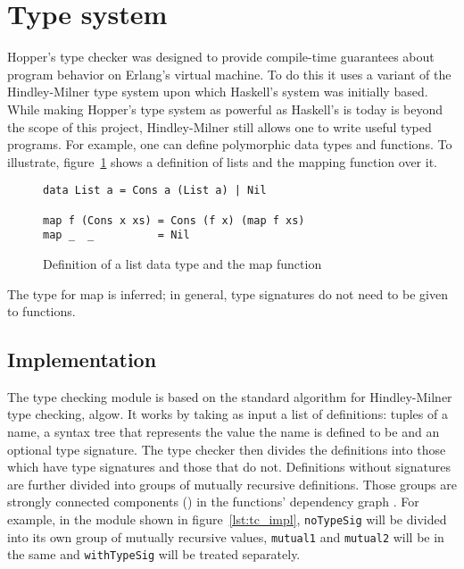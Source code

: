 \section{Type system}
\label{sec:dai_tc}

Hopper's type checker was designed to provide compile-time guarantees about program behavior on Erlang's virtual machine. To do this it uses a variant of the Hindley-Milner\cite{TypeSchemes} type system upon which Haskell's system was initially based. While making Hopper's type system as powerful as Haskell's is today is beyond the scope of this project, Hindley-Milner still allows one to write useful typed programs. For example, one can define polymorphic data types and functions. To illustrate, figure~\ref{lst:tc_map} shows a definition of lists and the mapping function over it. 

\begin{figure}[!htb]
\centering
\begin{minipage}[b]{0.68\linewidth}
\centering
\begin{lstlisting}
data List a = Cons a (List a) | Nil

map f (Cons x xs) = Cons (f x) (map f xs)
map _  _          = Nil
\end{lstlisting}
\end{minipage}
\caption{Definition of a list data type and the map function}
\label{lst:tc_map}
\end{figure}

The type for map is inferred; in general, type signatures do not need to be given to functions.

\subsection{Implementation}

The type checking module is based on the standard algorithm for Hindley-Milner type checking, \Gls{algow}. It works by taking as input a list of definitions: tuples of a name, a syntax tree that represents the value the name is defined to be and an optional type signature. The type checker then divides the definitions into those which have type signatures and those that do not. Definitions without signatures are further divided into groups of mutually recursive definitions. Those groups are strongly connected components ()  in the functions' dependency graph . For example, in the module shown in figure~\ref{lst:tc_impl}, \texttt{noTypeSig} will be divided into its own group of mutually recursive values, \texttt{mutual1} and \texttt{mutual2} will be in the same and \texttt{withTypeSig} will be treated separately. 

